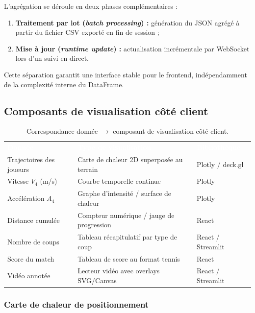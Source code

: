 L'agrégation se déroule en deux phases complémentaires :
\begin{enumerate}
  \item \textbf{Traitement par lot (\textit{batch processing}) :} génération du JSON
        agrégé à partir du fichier CSV exporté en fin de session ;
  \item \textbf{Mise à jour   (\textit{runtime update}) :} actualisation
        incrémentale par WebSocket lors d'un suivi en direct.
\end{enumerate}

Cette séparation garantit une interface stable pour le frontend, indépendamment de
la complexité interne du DataFrame.

\subsection{Composants de visualisation côté client}

\begin{table}[H]
  \centering
  \renewcommand{\arraystretch}{1.3}
  \begin{tabularx}{\textwidth}{L{4.5cm} X C{3cm}}
    \textcolor{white}{\textbf{Donnée}} &
    \textcolor{white}{\textbf{Type de visualisation}} &
    \textcolor{white}{\textbf{Bibliothèque}} \\
    Trajectoires des joueurs & Carte de chaleur 2D superposée au terrain & Plotly / deck.gl \\
    Vitesse $V_4$ (m/s) & Courbe temporelle continue & Plotly \\
    Accélération $A_4$ & Graphe d'intensité / surface de chaleur & Plotly \\
    Distance cumulée & Compteur numérique / jauge de progression & React \\
    Nombre de coups & Tableau récapitulatif par type de coup & React / Streamlit \\
    Score du match & Tableau de score au format tennis & React \\
    Vidéo annotée & Lecteur vidéo avec overlays SVG/Canvas & React / Streamlit \\
  \end{tabularx}
  \caption{Correspondance donnée $\to$ composant de visualisation côté client.}
  \label{tab:mapping_visu}
\end{table}

\subsubsection{Carte de chaleur de positionnement}

